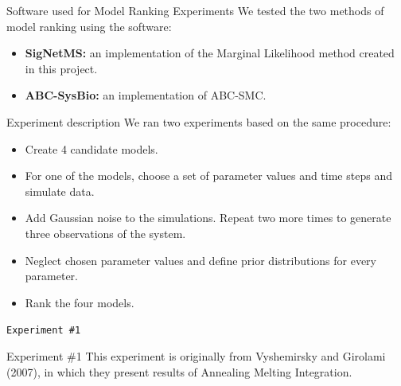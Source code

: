 \documentclass{beamer}
\begin{document}
\begin{frame}{Software used for Model Ranking Experiments}
We tested the two methods of model ranking using the software:
\pause
\begin{itemize}
\item{{\bf SigNetMS:} an implementation of the Marginal Likelihood 
    method created in this project.}
\pause
\item{{\bf ABC-SysBio:} an implementation of ABC-SMC.}
\end{itemize}
\end{frame}


\begin{frame}{Experiment description}
We ran two experiments based on the same procedure:
\begin{itemize}
    \pause
    \item{Create 4 candidate models.}
    \pause
    \item{For one of the models, choose a set of parameter values 
        and time steps and simulate data.}
    \pause
    \item{Add Gaussian noise to the simulations. Repeat two more 
        times to generate three observations of the system.}
    \pause
    \item{Neglect chosen parameter values and define prior distributions
        for every parameter.}
    \pause
    \item{Rank the four models.}
\end{itemize}
\end{frame}


\begin{frame}{}
\begin{center}
    \texttt{Experiment \#1}
\end{center}
\end{frame}


\begin{frame}{Experiment \#1}
This experiment is originally from Vyshemirsky and Girolami (2007), in 
which they present results of Annealing Melting Integration. 
\end{frame}
\end{document}
